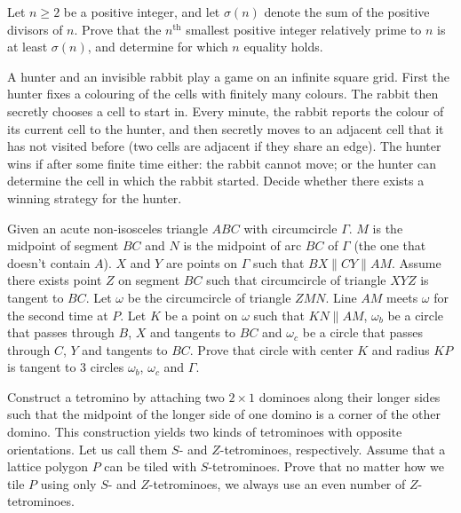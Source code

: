 \documentclass[11pt]{scrartcl}
\begin{document}
\begin{problem}[3458270318471332488]
	Let $n \ge 2$ be a positive integer, and let $\sigma(n)$ denote the sum of the positive divisors of $n$. Prove that the $n^{\text{th}}$ smallest positive integer relatively prime to $n$ is at least $\sigma(n)$, and determine for which $n$ equality holds.
\end{problem}
\begin{problem}[3470579368412517052]
	A hunter and an invisible rabbit play a game on an infinite square grid. First the hunter fixes a colouring of the cells with finitely many colours. The rabbit then secretly chooses a cell to start in. Every minute, the rabbit reports the colour of its current cell to the hunter, and then secretly moves to an adjacent cell that it has not visited before (two cells are adjacent if they share an edge). The hunter wins if after some finite time either:
the rabbit cannot move; or
the hunter can determine the cell in which the rabbit started.
Decide whether there exists a winning strategy for the hunter.
\end{problem}
\begin{problem}[3486221094563725571]
Given an acute non-isosceles triangle $ABC$ with circumcircle $\Gamma$. $M$ is the midpoint of segment $BC$ and $N$ is the midpoint of arc $BC$ of $\Gamma$ (the one that doesn't contain $A$). $X$ and $Y$ are points on $\Gamma$ such that $BX\parallel CY\parallel AM$. Assume there exists point $Z$ on segment $BC$ such that circumcircle of triangle $XYZ$ is tangent to $BC$. Let $\omega$ be the circumcircle of triangle $ZMN$. Line $AM$ meets $\omega$ for the second time at $P$. Let $K$ be a point on $\omega$ such that $KN\parallel AM$, $\omega_b$ be a circle that passes through $B$, $X$ and tangents to $BC$ and $\omega_c$ be a circle that passes through $C$, $Y$ and tangents to $BC$. Prove that circle with center $K$ and radius $KP$ is tangent to 3 circles $\omega_b$, $\omega_c$ and $\Gamma$.
\end{problem}
\begin{problem}[3556283025270446335]
Construct a tetromino by attaching two $2 \times 1$ dominoes along their longer sides such that the midpoint of the longer side of one domino is a corner of the other domino. This construction yields two kinds of tetrominoes with opposite orientations. Let us call them $S$- and $Z$-tetrominoes, respectively.
Assume that a lattice polygon $P$ can be tiled with $S$-tetrominoes. Prove that no matter how we tile $P$ using only $S$- and $Z$-tetrominoes, we always use an even number of $Z$-tetrominoes.
\end{problem}
\end{document}

